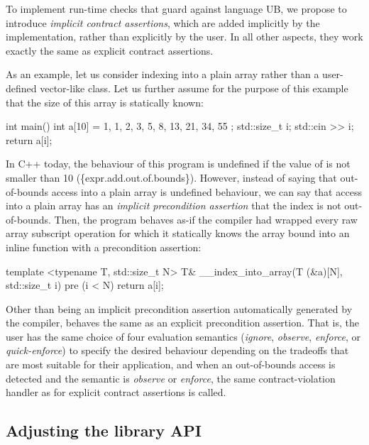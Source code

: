 To implement run-time checks that guard against language UB, we propose to introduce \emph{implicit contract assertions}, which are added implicitly by the implementation, rather than explicitly by the user. In all other aspects, they work exactly the same as explicit contract assertions.

As an example, let us consider indexing into a plain array rather than a user-defined vector-like class. Let us further assume for the purpose of this example that the size  of this array is statically known:

\begin{codeblock}
int main() {
  int a[10] = { 1, 1, 2, 3, 5, 8, 13, 21, 34, 55 };
  std::size_t i; 
  std::cin >> i;
  return a[i];
}
\end{codeblock}

In C++ today, the behaviour of this program is undefined if the value of  is not smaller than 10 (\{expr.add.out.of.bounds\}). However, instead of saying that out-of-bounds access into a plain array is undefined behaviour, we can say that access into a plain array has an \emph{implicit precondition assertion} that the index is not out-of-bounds. Then, the program behaves as-if the compiler had wrapped every raw array subscript operation for which it statically knows the array bound  into an inline function with a precondition assertion:

\begin{codeblock}
template <typename T, std::size_t N>
T& __index_into_array(T (&a)[N], std::size_t i)
pre (i < N) {
  return a[i];
}
\end{codeblock}

Other than being an implicit precondition assertion automatically generated by the compiler,  behaves the same as an explicit precondition assertion. That is, the user has the same choice of four evaluation semantics (\emph{ignore}, \emph{observe}, \emph{enforce}, or \emph{quick-enforce}) to specify the desired behaviour depending on the tradeoffs that are most suitable for their application, and when an out-of-bounds access is detected and the semantic is \emph{observe} or \emph{enforce}, the same contract-violation handler as for explicit contract assertions is called.

\subsection{Adjusting the library API}
\label{library}

